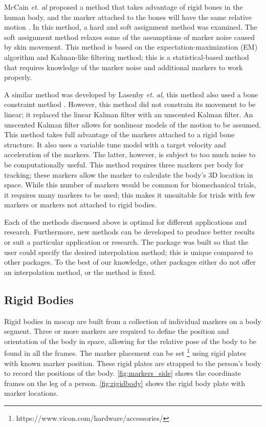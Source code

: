 McCain \textit{et. al} proposed a method that takes advantage of rigid bones in the human body, and the marker attached to the bones will have the same relative motion \cite{li2010bolero}. In this method, a hard and soft assignment method was examined. The soft assignment method relaxes some of the assumptions of marker noise caused by skin movement. This method is based on the expectation-maximization (EM) algorithm and Kalman-like filtering method; this is a statistical-based method that requires knowledge of the marker noise and additional markers to work properly. 

A similar method was developed by Lasenby \textit{et. al}, this method also used a bone constraint method \cite{aristidou2013real}. However, this method did not constrain its movement to be linear; it replaced the linear Kalman filter with an unscented Kalman filter. An unscented Kalman filter allows for nonlinear models of the motion to be assumed. This method takes full advantage of the markers attached to a rigid bone structure. It also uses a variable tune model with a target velocity and acceleration of the markers. The latter, however, is subject to too much noise to be computationally useful. This method requires three markers per body for tracking; these markers allow the marker to calculate the body's 3D location in space. While this number of markers would be common for biomechanical trials, it requires many markers to be used; this makes it unsuitable for trials with few markers or markers not attached to rigid bodies.

Each of the methods discussed above is optimal for different applications and research. Furthermore, new methods can be developed to produce better results or suit a particular application or research. The package was built so that the user could specify the desired interpolation method; this is unique compared to other packages. To the best of our knowledge, other packages either do not offer an interpolation method, or the method is fixed.  

\subsection{Rigid Bodies}

Rigid bodies in mocap are built from a collection of individual markers on a body segment. Three or more markers are required to define the position and orientation of the body in space, allowing for the relative pose of the body to be found in all the frames. The marker placement can be set \footnote{https://www.vicon.com/hardware/accessories/} using rigid plates with known marker position. These rigid plates are strapped to the person's body to record the positions of the body. \autoref{fig:markers_side} shows the coordinate frames on the leg of a person. \autoref{fig:rigidbody} shows the rigid body plate with marker locations. 

